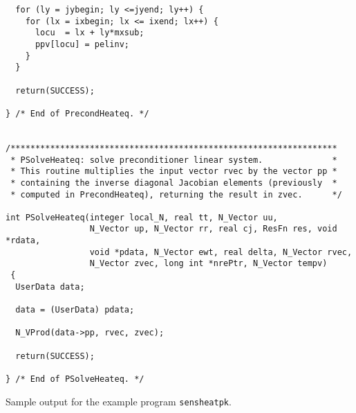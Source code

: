 \begin{verbatim}
  for (ly = jybegin; ly <=jyend; ly++) {
    for (lx = ixbegin; lx <= ixend; lx++) {
      locu  = lx + ly*mxsub;
      ppv[locu] = pelinv;
    }
  }

  return(SUCCESS);

} /* End of PrecondHeateq. */


/******************************************************************
 * PSolveHeateq: solve preconditioner linear system.              *
 * This routine multiplies the input vector rvec by the vector pp *
 * containing the inverse diagonal Jacobian elements (previously  *
 * computed in PrecondHeateq), returning the result in zvec.      */
  
int PSolveHeateq(integer local_N, real tt, N_Vector uu,
                 N_Vector up, N_Vector rr, real cj, ResFn res, void *rdata,
                 void *pdata, N_Vector ewt, real delta, N_Vector rvec,
                 N_Vector zvec, long int *nrePtr, N_Vector tempv)
 {
  UserData data;

  data = (UserData) pdata;

  N_VProd(data->pp, rvec, zvec);

  return(SUCCESS);

} /* End of PSolveHeateq. */
\end{verbatim}

Sample output for the example program {\tt sensheatpk}. \\

